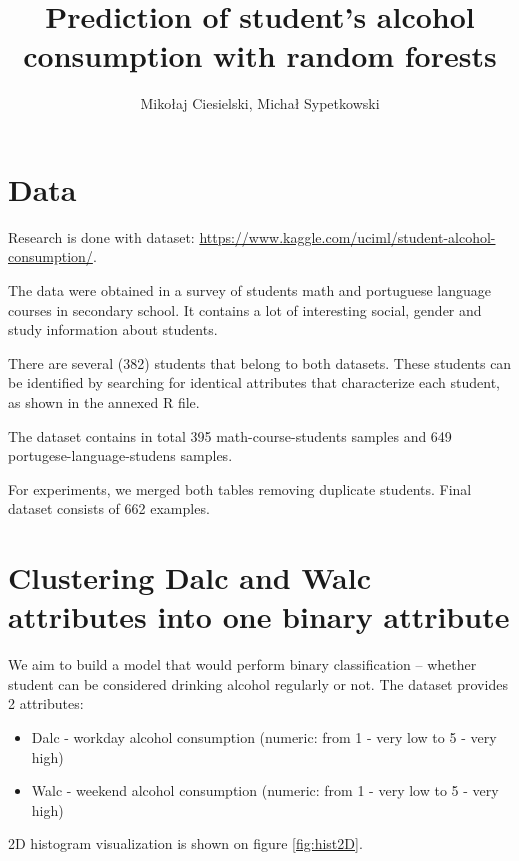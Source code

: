 \documentclass[a4paper]{article}
\begin{document}
\title{Prediction of student's alcohol consumption with random forests}

\author{Mikołaj Ciesielski, Michał Sypetkowski}
\maketitle


\begin{multicols}{2}

\section{Data}

Research is done with dataset: \url{https://www.kaggle.com/uciml/student-alcohol-consumption/}.

The data were obtained in a survey of students
math and portuguese language courses in secondary school.
It contains a lot of interesting social,
gender and study information about students.

There are several (382) students that belong to both datasets.
These students can be identified by searching for identical attributes
that characterize each student, as shown in the annexed R file.

The dataset contains in total 395 math-course-students samples and 
649 portugese-language-studens samples.

For experiments, we merged both tables removing duplicate students.
Final dataset consists of 662 examples.


\section{Clustering Dalc and Walc attributes into one binary attribute}
\label{clust}

We aim to build a model that would perform binary classification --
whether student can be considered drinking alcohol regularly or not.
The dataset provides 2 attributes:
\begin{itemize}
    \item Dalc - workday alcohol consumption (numeric: from 1 - very low to 5 - very high)
    \item Walc - weekend alcohol consumption (numeric: from 1 - very low to 5 - very high)
\end{itemize}
2D histogram visualization is shown on figure \ref{fig:hist2D}.


\end{multicols}
\end{document}
